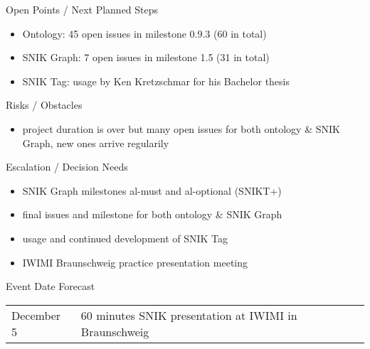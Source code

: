 \documentclass[]{kiesgrube}
\begin{document}
\begin{poster}
\begin{posterbox}[name=open,column=1,below=description]{Open Points / Next Planned Steps}
\begin{itemize}
\item Ontology: 45 open issues in milestone 0.9.3 (60 in total)
\item SNIK Graph: 7 open issues in milestone 1.5 (31 in total)
\item SNIK Tag: usage by Ken Kretzschmar for his Bachelor thesis
\end{itemize}
\end{posterbox}
\begin{posterbox}[name=risks,column=1,below=open]{Risks / Obstacles}
\begin{itemize}
\item project duration is over but many open issues for both ontology \& SNIK Graph, new ones arrive regularily
\end{itemize}
\end{posterbox}
\begin{posterbox}[name=escalation,column=1,below=risks]{Escalation / Decision Needs}
\footnotesize
\begin{itemize}
\item SNIK Graph milestones al-must and al-optional (SNIKT+)
\item final issues and milestone for both ontology \& SNIK Graph
\item usage and continued development of SNIK Tag
\item IWIMI Braunschweig practice presentation meeting
\end{itemize}
\end{posterbox}
\begin{posterbox}[name=event,column=1,below=escalation]{Event Date Forecast}
\small
\begin{tabulary}{\textwidth}{lL}
December 5	&60 minutes SNIK presentation at IWIMI in Braunschweig\\
\end{tabulary}
\end{posterbox}


\end{poster}
\end{document}
